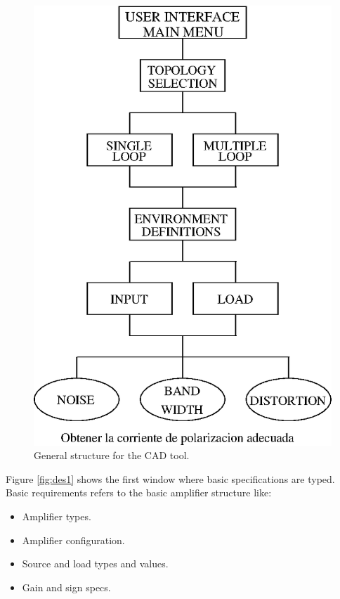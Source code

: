\documentclass[twocolumn]{IEEEtran}
\begin{document}
\begin{figure}[hbtp]
	\centering
	\includegraphics[scale=0.5]{figuras/DESCAD_1.eps}
	\caption{General structure for the CAD tool.}
	\label{fig:descad}
\end{figure}

Figure \ref{fig:des1} shows the first window where basic specifications are typed. Basic requirements refers to the basic amplifier structure like:

\begin{itemize}
\item Amplifier types.
\item Amplifier configuration.
\item Source and load types and values.
\item Gain and sign specs.
\end{itemize}
\end{document}
